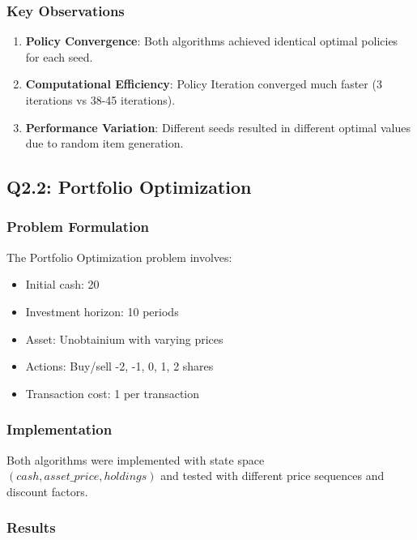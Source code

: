 \documentclass[12pt]{article}
\begin{document}
\subsubsection{Key Observations}

\begin{enumerate}
    \item \textbf{Policy Convergence}: Both algorithms achieved identical optimal policies for each seed.
    
    \item \textbf{Computational Efficiency}: Policy Iteration converged much faster (3 iterations vs 38-45 iterations).
    
    \item \textbf{Performance Variation}: Different seeds resulted in different optimal values due to random item generation.
\end{enumerate}

\subsection{Q2.2: Portfolio Optimization}

\subsubsection{Problem Formulation}

The Portfolio Optimization problem involves:
\begin{itemize}
    \item Initial cash: 20
    \item Investment horizon: 10 periods
    \item Asset: Unobtainium with varying prices
    \item Actions: Buy/sell {-2, -1, 0, 1, 2} shares
    \item Transaction cost: 1 per transaction
\end{itemize}

\subsubsection{Implementation}

Both algorithms were implemented with state space $(cash, asset\_price, holdings)$ and tested with different price sequences and discount factors.

\subsubsection{Results}
\end{document}
